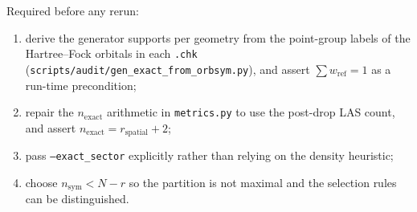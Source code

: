 Required before any rerun:
\begin{enumerate}[leftmargin=1.4em]
  \item derive the generator supports per geometry from the point-group labels
        of the Hartree--Fock orbitals in each \texttt{.chk}
        (\texttt{scripts/audit/gen\_exact\_from\_orbsym.py}), and assert
        $\sum w_{\mathrm{ref}} = 1$ as a run-time precondition;
  \item repair the $n_{\mathrm{exact}}$ arithmetic in \texttt{metrics.py} to
        use the post-drop LAS count, and assert
        $n_{\mathrm{exact}} = r_{\mathrm{spatial}} + 2$;
  \item pass \texttt{--exact\_sector} explicitly rather than relying on the
        density heuristic;
  \item choose $n_{\mathrm{sym}} < N - r$ so the partition is not maximal and
        the selection rules can be distinguished.
\end{enumerate}

